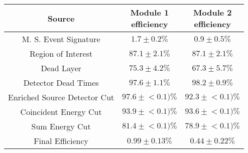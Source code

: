 \begin{tabular}{|c|c|c|}
\hline
  Source & \makecell{Module 1\\efficiency} & \makecell{Module 2\\efficiency} \\
\hline
  M. S. Event Signature & $1.7 \pm 0.2\%$ & $0.9 \pm 0.5\%$ \\
  Region of Interest & $87.1 \pm 2.1\%$ & $87.1 \pm 2.1\%$ \\
  Dead Layer & $75.3 \pm 4.2\%$ & $67.3 \pm 5.7\%$ \\
  Detector Dead Times & $97.6 \pm 1.1\%$ & $98.2 \pm 0.9\%$ \\
  Enriched Source Detector Cut & $97.6 \pm{}<\!0.1)\%$ & $92.3 \pm{}<\!0.1)\%$ \\
  Coincident Energy Cut & $93.9 \pm{}<\!0.1)\%$ & $93.6 \pm{}<\!0.1)\%$ \\
  Sum Energy Cut & $81.4 \pm{}<\!0.1)\%$ & $78.9 \pm{}<\!0.1)\%$ \\
  \hline Final Efficiency & $0.99 \pm 0.13\%$ & $0.44 \pm 0.22\%$ \\
\hline
\end{tabular}
